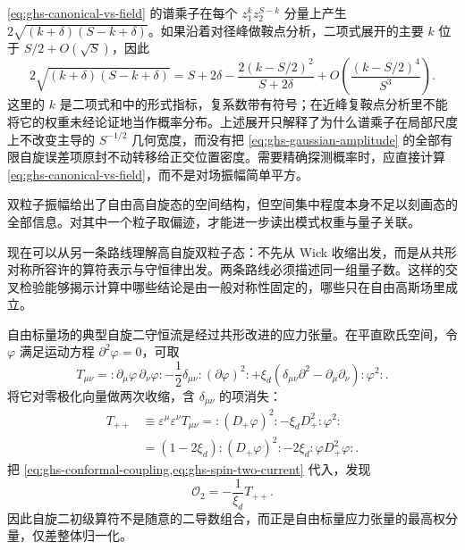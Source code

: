 \cref{eq:ghs-canonical-vs-field} 的谱乘子在每个 $z_1^kz_2^{S-k}$ 分量上产生 $2\sqrt{(k+\delta)(S-k+\delta)}$。如果沿着对径峰做鞍点分析，二项式展开的主要 $k$ 位于 $S/2+O(\sqrt S)$，因此
\begin{equation}\label{eq:ghs-canonical-asymptotic-multiplier}
 2\sqrt{(k+\delta)(S-k+\delta)}
 =S+2\delta-\frac{2(k-S/2)^2}{S+2\delta}
 +O\!\left(\frac{(k-S/2)^4}{S^3}\right).
\end{equation}
这里的 $k$ 是二项式和中的形式指标，复系数带有符号；在近峰复鞍点分析里不能将它的权重未经论证地当作概率分布。上述展开只解释了为什么谱乘子在局部尺度上不改变主导的 $S^{-1/2}$ 几何宽度，而没有把 \cref{eq:ghs-gaussian-amplitude} 的全部有限自旋误差项原封不动转移给正交位置密度。需要精确探测概率时，应直接计算 \cref{eq:ghs-canonical-vs-field}，而不是对场振幅简单平方。


双粒子振幅给出了自由高自旋态的空间结构，但空间集中程度本身不足以刻画态的全部信息。对其中一个粒子取偏迹，才能进一步读出模式权重与量子关联。


现在可以从另一条路线理解高自旋双粒子态：不先从 Wick 收缩出发，而是从共形对称所容许的算符表示与守恒律出发。两条路线必须描述同一组量子数。这样的交叉检验能够揭示计算中哪些结论是由一般对称性固定的，哪些只在自由高斯场里成立。


自由标量场的典型自旋二守恒流是经过共形改进的应力张量。在平直欧氏空间，令 $\varphi$ 满足运动方程 $\partial^2\varphi=0$，可取
\begin{equation}\label{eq:ghs-improved-stress}
 T_{\mu\nu}=:\!\partial_\mu\varphi\,\partial_\nu\varphi\!:
 -\frac12\delta_{\mu\nu}:\!(\partial\varphi)^2\!:
 +\xi_d(\delta_{\mu\nu}\partial^2-\partial_\mu\partial_\nu):\!\varphi^2\!: .
\end{equation}
将它对零极化向量做两次收缩，含 $\delta_{\mu\nu}$ 的项消失：
\begin{align*}
 T_{++}&\equiv\varepsilon^\mu\varepsilon^\nu T_{\mu\nu}
 =:(D_+\varphi)^2:-\xi_dD_+^2:\!\varphi^2\!:\\
 &=(1-2\xi_d):(D_+\varphi)^2:-2\xi_d:\!\varphi D_+^2\varphi\!: .
\end{align*}
把 \cref{eq:ghs-conformal-coupling,eq:ghs-spin-two-current} 代入，发现
\begin{equation}\label{eq:ghs-stress-spin-two}
 \mathcal O_2=-\frac1{\xi_d}T_{++}.
\end{equation}
因此自旋二初级算符不是随意的二导数组合，而正是自由标量应力张量的最高权分量，仅差整体归一化。


